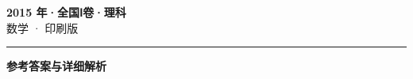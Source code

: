 \documentclass[zihao=5, a4paper]{ctexart}
\begin{document}
\begin{center}
  {\Large\bfseries 2015 年·全国Ⅰ卷·理科}\\[4pt]
  {\large 数学 · 印刷版}
\end{center}
\medskip
{}

\par\bigskip\hrule\bigskip
{}
\begin{center}{\large\bfseries 参考答案与详细解析}\end{center}
\smallskip

\end{document}
